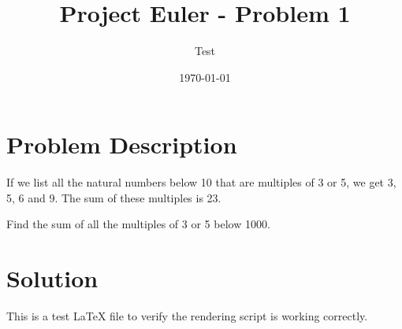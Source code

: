 \documentclass{article}
\title{Project Euler - Problem 1}
\author{Test}
\date{\today}
\begin{document}
\maketitle

\section{Problem Description}
If we list all the natural numbers below 10 that are multiples of 3 or 5, we get 3, 5, 6 and 9. The sum of these multiples is 23.

Find the sum of all the multiples of 3 or 5 below 1000.

\section{Solution}
This is a test LaTeX file to verify the rendering script is working correctly.
\end{document}
